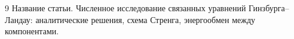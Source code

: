 \documentclass{article}
\begin{document}


\begin{thebibliography}{9}
     Название статьи. Численное исследование связанных уравнений Гинзбурга–Ландау: аналитические решения, схема Стренга, энергообмен между компонентами.
\end{thebibliography}
\end{document}
